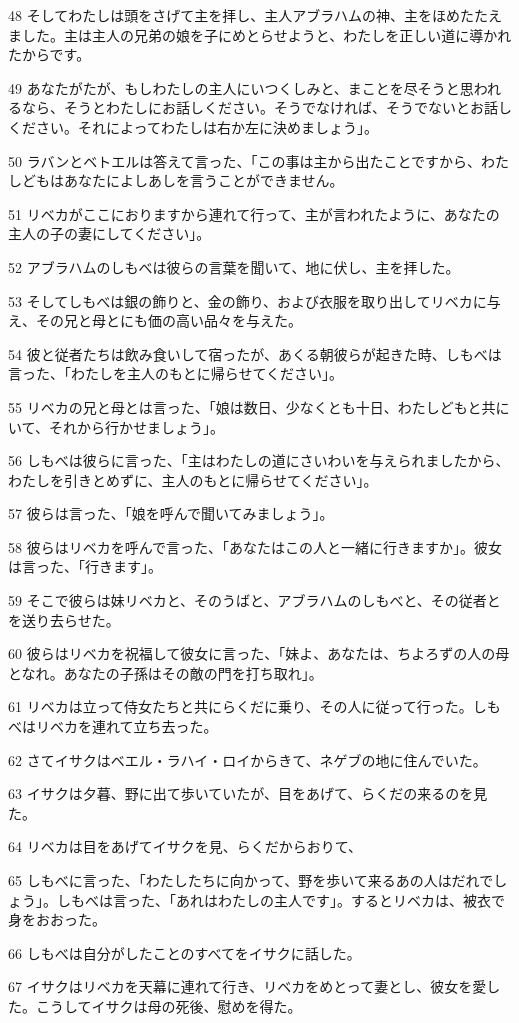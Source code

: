 \par 48 そしてわたしは頭をさげて主を拝し、主人アブラハムの神、主をほめたたえました。主は主人の兄弟の娘を子にめとらせようと、わたしを正しい道に導かれたからです。
\par 49 あなたがたが、もしわたしの主人にいつくしみと、まことを尽そうと思われるなら、そうとわたしにお話しください。そうでなければ、そうでないとお話しください。それによってわたしは右か左に決めましょう」。
\par 50 ラバンとベトエルは答えて言った、「この事は主から出たことですから、わたしどもはあなたによしあしを言うことができません。
\par 51 リベカがここにおりますから連れて行って、主が言われたように、あなたの主人の子の妻にしてください」。
\par 52 アブラハムのしもべは彼らの言葉を聞いて、地に伏し、主を拝した。
\par 53 そしてしもべは銀の飾りと、金の飾り、および衣服を取り出してリベカに与え、その兄と母とにも価の高い品々を与えた。
\par 54 彼と従者たちは飲み食いして宿ったが、あくる朝彼らが起きた時、しもべは言った、「わたしを主人のもとに帰らせてください」。
\par 55 リベカの兄と母とは言った、「娘は数日、少なくとも十日、わたしどもと共にいて、それから行かせましょう」。
\par 56 しもべは彼らに言った、「主はわたしの道にさいわいを与えられましたから、わたしを引きとめずに、主人のもとに帰らせてください」。
\par 57 彼らは言った、「娘を呼んで聞いてみましょう」。
\par 58 彼らはリベカを呼んで言った、「あなたはこの人と一緒に行きますか」。彼女は言った、「行きます」。
\par 59 そこで彼らは妹リベカと、そのうばと、アブラハムのしもべと、その従者とを送り去らせた。
\par 60 彼らはリベカを祝福して彼女に言った、「妹よ、あなたは、ちよろずの人の母となれ。あなたの子孫はその敵の門を打ち取れ」。
\par 61 リベカは立って侍女たちと共にらくだに乗り、その人に従って行った。しもべはリベカを連れて立ち去った。
\par 62 さてイサクはベエル・ラハイ・ロイからきて、ネゲブの地に住んでいた。
\par 63 イサクは夕暮、野に出て歩いていたが、目をあげて、らくだの来るのを見た。
\par 64 リベカは目をあげてイサクを見、らくだからおりて、
\par 65 しもべに言った、「わたしたちに向かって、野を歩いて来るあの人はだれでしょう」。しもべは言った、「あれはわたしの主人です」。するとリベカは、被衣で身をおおった。
\par 66 しもべは自分がしたことのすべてをイサクに話した。
\par 67 イサクはリベカを天幕に連れて行き、リベカをめとって妻とし、彼女を愛した。こうしてイサクは母の死後、慰めを得た。

